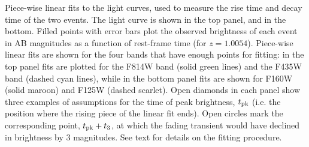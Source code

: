 Piece-wise linear fits to the \spock light curves, used to measure the rise time and decay time of the two events.  The \spockone light curve is shown in the top panel, and \spocktwo in the bottom. Filled points with error bars plot the observed brightness of each event in AB magnitudes as a function of rest-frame time (for $z=1.0054$). Piece-wise linear fits are shown for the four bands that have enough points for fitting: in the top panel fits are plotted for the F814W band (solid green lines) and the F435W band (dashed cyan lines), while in the bottom panel fits are shown for F160W (solid maroon) and F125W (dashed scarlet).  Open diamonds in each panel show three examples of assumptions for the time of peak brightness, $t_{\rm pk}$ (i.e. the position where the rising piece of the linear fit ends).  Open circles mark the corresponding point, $t_{\rm pk} + t_3$, at which the fading transient would have declined in brightness by 3 magnitudes.  See text for details on the fitting procedure.
\label{fig:LinearLightCurveFits}
